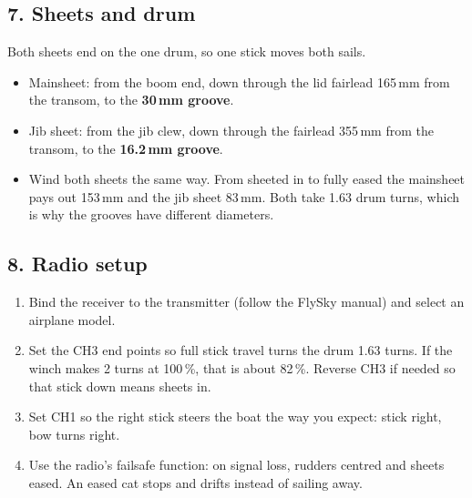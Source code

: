 \documentclass[11pt]{article}
\newcommand{\step}[1]{\subsection*{\color{accent}#1}}
\begin{document}
\step{7. Sheets and drum}
Both sheets end on the one drum, so one stick moves both sails.
\begin{center}\par{}\end{center}
\begin{itemize}
\item Mainsheet: from the boom end, down through the lid fairlead 165\,mm from the transom, to the \textbf{30\,mm groove}.
\item Jib sheet: from the jib clew, down through the fairlead 355\,mm from the transom, to the \textbf{16.2\,mm groove}.
\item Wind both sheets the same way. From sheeted in to fully eased the mainsheet pays out 153\,mm and the jib sheet 83\,mm. Both take 1.63 drum turns, which is why the grooves have different diameters.
\end{itemize}

\step{8. Radio setup}
\begin{enumerate}
\item Bind the receiver to the transmitter (follow the FlySky manual) and select an airplane model.
\item Set the CH3 end points so full stick travel turns the drum 1.63 turns. If the winch makes 2 turns at 100\,\%, that is about 82\,\%. Reverse CH3 if needed so that stick down means sheets in.
\item Set CH1 so the right stick steers the boat the way you expect: stick right, bow turns right.
\item Use the radio's failsafe function: on signal loss, rudders centred and sheets eased. An eased cat stops and drifts instead of sailing away.
\end{enumerate}
\end{document}

